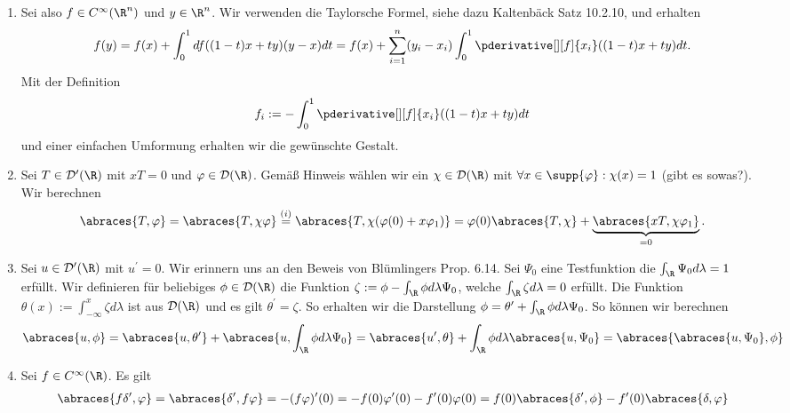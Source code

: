 \begin{solution}
\phantom{}
\begin{enumerate}[label = (\roman*)]
	\item Sei also $f \in C^\infty(\R^n)$ und $y \in \R^n$. Wir verwenden die Taylorsche Formel, siehe dazu Kaltenbäck Satz 10.2.10, und erhalten
	\begin{align*}
	f(y) = f(x) + \int_0^1 df((1-t)x + ty)(y - x) dt = f(x) + \sum_{i = 1}^n (y_i - x_i) \int_0^1 \pderivative[][f]{x_i} ((1-t)x + ty) dt.
	\end{align*}
	Mit der Definition 
	\begin{align*}
	f_i := -\int_0^1  \pderivative[][f]{x_i} ((1-t)x + ty) dt
	\end{align*}
	und einer einfachen Umformung erhalten wir die gewünschte Gestalt.
	\item Sei $T \in \mathcal{D}^\prime(\R)$ mit $xT = 0$ und $\varphi \in \mathcal{D}(\R)$. Gemäß Hinweis wählen wir ein $\chi \in \mathcal{D}(\R)$ mit $\forall x \in \supp{\varphi}: \chi(x) = 1$ (gibt es sowas?). Wir berechnen
	\begin{align*}
	\abraces{T,\varphi} = \abraces{T, \chi \varphi} \stackrel{(i)}{=} \abraces{T, \chi (\varphi(0) + x\varphi_1)} = \varphi(0) \abraces{T, \chi} + \underbrace{\abraces{xT, \chi \varphi_1}}_{=0}.
	\end{align*}
	\item Sei $u \in \mathcal{D}^\prime(\R)$ mit $u^\prime = 0$. Wir erinnern uns an den Beweis von Blümlingers Prop. 6.14. Sei $\Psi_0$ eine Testfunktion die $\int_\R \Psi_0 d\lambda = 1$ erfüllt. Wir definieren für beliebiges $\phi \in \mathcal{D}(\R)$ die Funktion $\zeta := \phi - \int_\R \phi d\lambda \Psi_0$, welche $\int_\R \zeta d\lambda = 0$ erfüllt. Die Funktion $\theta(x) := \int_{-\infty}^{x} \zeta d\lambda$ ist aus $\mathcal{D}(\R)$ und es gilt $\theta^\prime = \zeta$. So erhalten wir die Darstellung $\phi = \theta^\prime + \int_\R \phi d\lambda \Psi_0$. So können wir berechnen
	\begin{align*}
	\abraces{u, \phi} = \abraces{u, \theta^\prime} + \abraces{u, \int_\R \phi d\lambda \Psi_0} = \abraces{u^\prime, \theta} + \int_\R \phi d\lambda \abraces{u, \Psi_0} = \abraces{\abraces{u, \Psi_0}, \phi}
	\end{align*}
	\item Sei $f \in C^\infty(\R)$. Es gilt
	\begin{align*}
	\abraces{f \delta^\prime, \varphi} = \abraces{\delta^\prime, f\varphi} = - (f\varphi)^\prime (0) = -f(0) \varphi^\prime(0) - f^\prime(0) \varphi(0) = f(0) \abraces{\delta^\prime, \phi} - f^\prime(0) \abraces{\delta, \varphi}
	\end{align*}
\end{enumerate}

\end{solution}

